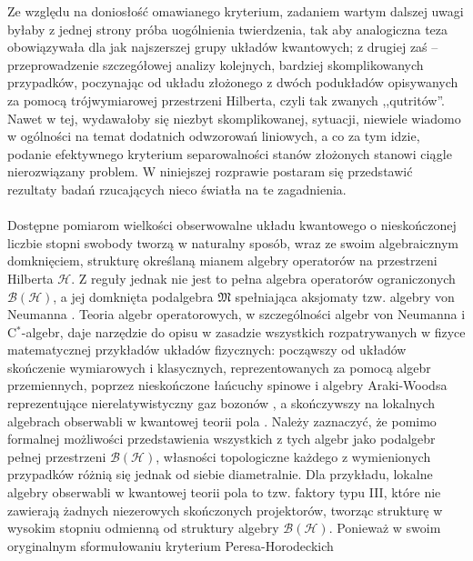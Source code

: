 Ze względu na doniosłość omawianego kryterium,
zadaniem wartym dalszej uwagi
byłaby z jednej strony próba uogólnienia twierdzenia,
tak aby analogiczna teza obowiązywała dla jak najszerszej grupy układów kwantowych;
z drugiej zaś -- przeprowadzenie szczegółowej analizy kolejnych,
bardziej skomplikowanych przypadków,
poczynając od układu złożonego z dwóch podukładów
opisywanych za pomocą trójwymiarowej przestrzeni Hilberta,
czyli tak zwanych ,,qutritów''.
Nawet w tej,
wydawałoby się niezbyt skomplikowanej,
sytuacji,
niewiele wiadomo w ogólności na temat dodatnich odwzorowań liniowych,
a co za tym idzie,
podanie efektywnego kryterium separowalności stanów złożonych stanowi
ciągle nierozwiązany problem.
W niniejszej rozprawie postaram się przedstawić rezultaty badań
rzucających nieco światła na te zagadnienia.

\paragraph{}
\label{par:intro:02}
Dostępne pomiarom wielkości obserwowalne układu kwantowego o nieskończonej
liczbie stopni swobody tworzą w naturalny sposób,
wraz ze swoim algebraicznym domknięciem,
strukturę określaną mianem algebry operatorów na przestrzeni Hilberta
$\mathcal{H}$.
Z reguły jednak nie jest to pełna algebra operatorów ograniczonych
$\mathcal{B}(\mathcal{H})$,
a jej domknięta podalgebra $\mathfrak{M}$ spełniająca aksjomaty tzw.
algebry von Neumanna
\cite{Takesaki1}.
Teoria algebr operatorowych,
w szczególności algebr von Neumanna i \mbox{C$^{*}$-algebr},
daje narzędzie do opisu w zasadzie wszystkich rozpatrywanych
w fizyce matematycznej przykładów układów fizycznych:
począwszy od układów skończenie wymiarowych i klasycznych,
reprezentowanych za pomocą algebr przemiennych,
poprzez nieskończone łańcuchy spinowe i algebry Araki-Woodsa reprezentujące
nierelatywistyczny gaz bozonów
\cite{araki1968classification},
a skończywszy na lokalnych algebrach obserwabli w kwantowej teorii pola
\cite{Nielsen2010}.
Należy zaznaczyć,
że pomimo formalnej możliwości przedstawienia wszystkich z tych algebr jako
podalgebr pełnej przestrzeni $\mathcal{B}(\mathcal{H})$,
własności topologiczne każdego z wymienionych przypadków
różnią się jednak od siebie diametralnie.
Dla przykładu, lokalne algebry obserwabli w kwantowej teorii pola
to tzw. faktory typu III,
które nie zawierają żadnych niezerowych skończonych projektorów,
tworząc strukturę w wysokim stopniu odmienną od struktury algebry $\mathcal{B}(\mathcal{H})$.
Ponieważ w swoim oryginalnym sformułowaniu kryterium Peresa-Horodeckich
